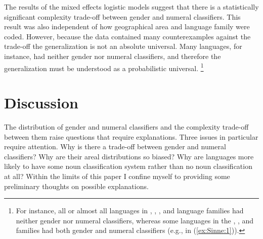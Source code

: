 \documentclass[output=collectionpaper]{langsci/langscibook}
\begin{document}
The results of the mixed effects logistic models suggest that there is a statistically significant complexity trade-off between gender and numeral classifiers. This result was also independent of how geographical area and language family were coded. However, because the data contained many counterexamples against the trade-off the generalization is not an absolute universal. Many languages, for instance, had neither gender nor numeral classifiers, and therefore the generalization must be understood as a probabilistic universal.%
\footnote{For instance, all or almost all languages in , , , and  language families had neither gender nor numeral classifiers, whereas some languages in the , , and  families had both gender and numeral classifiers (e.g.,  in (\ref{ex:Sinne:1})).}


\section{Discussion}
\label{sec:Sinne:5}

The distribution of gender and numeral classifiers and the complexity trade-off between them raise questions that require explanations. Three issues in particular require attention. Why is there a trade-off between gender and numeral classifiers? Why are their areal distributions so biased? Why are languages more likely to have some noun classification system rather than no noun classification at all? Within the limits of this paper I confine myself to providing some preliminary thoughts on possible explanations.
\end{document}
